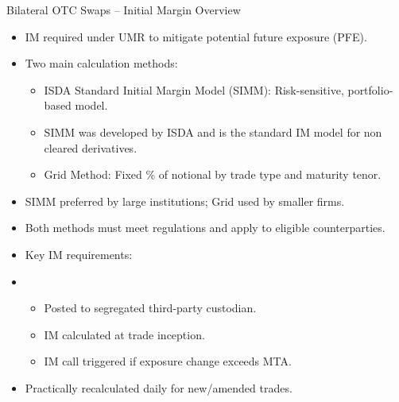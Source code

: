 \documentclass[handout, aspectratio=169]{beamer}
\begin{document}
\begin{frame}{Bilateral OTC Swaps – Initial Margin Overview}
  \begin{itemize}
    \item IM required under UMR to mitigate potential future exposure (PFE).
    \item Two main calculation methods:
    \begin{itemize}
      \item ISDA Standard Initial Margin Model (SIMM): Risk-sensitive, portfolio-based model.
      \item SIMM was developed by ISDA and is the standard IM model for non cleared derivatives.
      \item Grid Method: Fixed \% of notional by trade type and maturity tenor.
    \end{itemize}
    \item SIMM preferred by large institutions; Grid used by smaller firms.
    \item Both methods must meet regulations and apply to eligible counterparties.
    \item Key IM requirements:
    \item 
    \begin{itemize}
      \item Posted to segregated third-party custodian.
      \item IM calculated at trade inception.
      \item IM call triggered if exposure change exceeds MTA.
    \end{itemize}
    \item Practically recalculated daily for new/amended trades.
  \end{itemize}
\end{frame}
\end{document}
